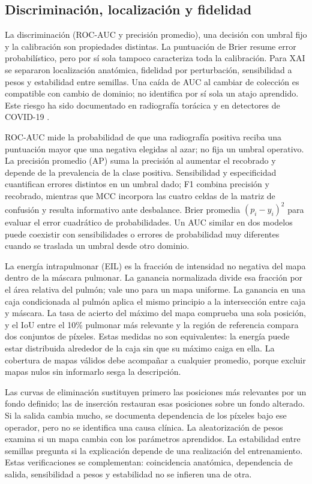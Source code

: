 \documentclass[conference]{IEEEtran}
\begin{document}
\subsection{Discriminación, localización y fidelidad}
La discriminación (ROC-AUC y precisión promedio), una decisión con umbral fijo y la calibración son propiedades distintas. La puntuación de Brier resume error probabilístico, pero por sí sola tampoco caracteriza toda la calibración. Para XAI se separaron localización anatómica, fidelidad por perturbación, sensibilidad a pesos y estabilidad entre semillas. Una caída de AUC al cambiar de colección es compatible con cambio de dominio; no identifica por sí sola un atajo aprendido. Este riesgo ha sido documentado en radiografía torácica y en detectores de COVID-19 \cite{zech2018,degrave2021}.

ROC-AUC mide la probabilidad de que una radiografía positiva reciba una puntuación mayor que una negativa elegidas al azar; no fija un umbral operativo. La precisión promedio (AP) suma la precisión al aumentar el recobrado y depende de la prevalencia de la clase positiva. Sensibilidad y especificidad cuantifican errores distintos en un umbral dado; F1 combina precisión y recobrado, mientras que MCC incorpora las cuatro celdas de la matriz de confusión y resulta informativo ante desbalance. Brier promedia $(p_i-y_i)^2$ para evaluar el error cuadrático de probabilidades. Un AUC similar en dos modelos puede coexistir con sensibilidades o errores de probabilidad muy diferentes cuando se traslada un umbral desde otro dominio.

La energía intrapulmonar (EIL) es la fracción de intensidad no negativa del mapa dentro de la máscara pulmonar. La ganancia normalizada divide esa fracción por el área relativa del pulmón; vale uno para un mapa uniforme. La ganancia en una caja condicionada al pulmón aplica el mismo principio a la intersección entre caja y máscara. La tasa de acierto del máximo del mapa comprueba una sola posición, y el IoU entre el 10\% pulmonar más relevante y la región de referencia compara dos conjuntos de píxeles. Estas medidas no son equivalentes: la energía puede estar distribuida alrededor de la caja sin que su máximo caiga en ella. La cobertura de mapas válidos debe acompañar a cualquier promedio, porque excluir mapas nulos sin informarlo sesga la descripción.

Las curvas de eliminación sustituyen primero las posiciones más relevantes por un fondo definido; las de inserción restauran esas posiciones sobre un fondo alterado. Si la salida cambia mucho, se documenta dependencia de los píxeles bajo ese operador, pero no se identifica una causa clínica. La aleatorización de pesos examina si un mapa cambia con los parámetros aprendidos. La estabilidad entre semillas pregunta si la explicación depende de una realización del entrenamiento. Estas verificaciones se complementan: coincidencia anatómica, dependencia de salida, sensibilidad a pesos y estabilidad no se infieren una de otra.
\end{document}
